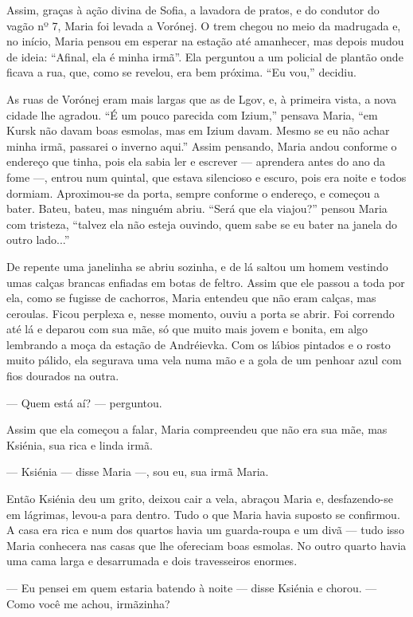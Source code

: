 Assim, graças à ação divina de Sofia, a lavadora de pratos, e do
condutor do vagão nº 7, Maria foi levada a Vorónej. O trem chegou no
meio da madrugada e, no início, Maria pensou em esperar na estação até
amanhecer, mas depois mudou de ideia: ``Afinal, ela é minha irmã''. Ela
perguntou a um policial de plantão onde ficava a rua, que, como se
revelou, era bem próxima. ``Eu vou,'' decidiu.

As ruas de Vorónej eram mais largas que as de Lgov, e, à primeira vista,
a nova cidade lhe agradou. ``É um pouco parecida com Izium,'' pensava
Maria, ``em Kursk não davam boas esmolas, mas em Izium davam. Mesmo se
eu não achar minha irmã, passarei o inverno aqui.'' Assim pensando,
Maria andou conforme o endereço que tinha, pois ela sabia ler e escrever
--- aprendera antes do ano da fome ---, entrou num quintal, que estava
silencioso e escuro, pois era noite e todos dormiam. Aproximou-se da
porta, sempre conforme o endereço, e começou a bater. Bateu, bateu, mas
ninguém abriu. ``Será que ela viajou?'' pensou Maria com tristeza,
``talvez ela não esteja ouvindo, quem sabe se eu bater na janela do
outro lado...''

De repente uma janelinha se abriu sozinha, e de lá saltou um homem
vestindo umas calças brancas enfiadas em botas de feltro. Assim que ele
passou a toda por ela, como se fugisse de cachorros, Maria entendeu que
não eram calças, mas ceroulas. Ficou perplexa e, nesse momento, ouviu a
porta se abrir. Foi correndo até lá e deparou com sua mãe, só que muito
mais jovem e bonita, em algo lembrando a moça da estação de Andréievka.
Com os lábios pintados e o rosto muito pálido, ela segurava uma vela
numa mão e a gola de um penhoar azul com fios dourados na outra.

--- Quem está aí? --- perguntou.

Assim que ela começou a falar, Maria compreendeu que não era sua mãe,
mas Ksiénia, sua rica e linda irmã.

--- Ksiénia --- disse Maria ---, sou eu, sua irmã Maria.

Então Ksiénia deu um grito, deixou cair a vela, abraçou Maria e,
desfazendo-se em lágrimas, levou-a para dentro. Tudo o que Maria havia
suposto se confirmou. A casa era rica e num dos quartos havia um
guarda-roupa e um divã --- tudo isso Maria conhecera nas casas que lhe
ofereciam boas esmolas. No outro quarto havia uma cama larga e
desarrumada e dois travesseiros enormes.

--- Eu pensei em quem estaria batendo à noite --- disse Ksiénia e
chorou. --- Como você me achou, irmãzinha?


